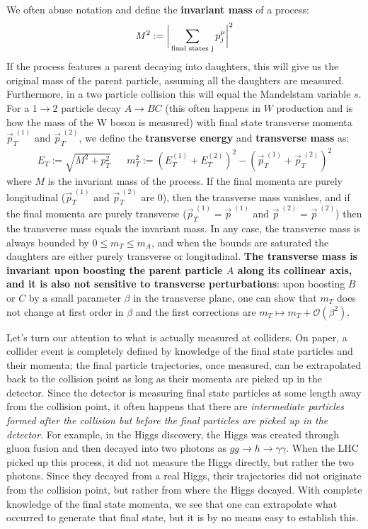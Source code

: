 \documentclass[11pt, oneside]{article}   	%
\theoremstyle{definition}
\numberwithin{equation}{subsection}		%
\begin{document}
We often abuse notation and define the \textbf{invariant mass} of a process:
\begin{equation}
	M^2 := \bigg|\sum_\textnormal{final states j} p_j^\mu\bigg|^2
\end{equation}
If the process features a parent decaying into daughters, this will give us the original mass of the parent particle, assuming all the daughters 
are measured. Furthermore, in a two particle collision this will equal the Mandelstam variable $s$. 
For a $1\rightarrow 2$ particle decay $A\rightarrow BC$ (this often happens in $W$ production and is how the mass of the W boson is 
measured) with final state transverse momenta $\vec p_T^{\;(1)}$ and $\vec p_T^{\;(2)}$, we define the \textbf{transverse energy} and 
\textbf{transverse mass} as:
\begin{align}
	E_T := \sqrt{M^2 + p_T^2} && m_T^2 := \left(E_T^{(1)} + E_T^{(2)}\right)^2 - \left(\vec p_T^{\;(1)} + \vec p_T^{\;(2)}\right)^2
\end{align}
where $M$ is the invariant mass of the process. If the final momenta are purely longitudinal ($\vec p_T^{\;(1)}$ and $\vec p_T^{\;(2)}$ are 0), 
then the transverse mass vanishes, and if the final momenta are purely transverse ($\vec p_T^{\;(1)} = \vec p^{\;(1)}$ and 
$\vec p^{\;(2)} = \vec p^{\;(2)}$) then the transverse mass equals the invariant mass. In any case, the transverse mass is always bounded by 
$0\leq m_T \leq m_A$, and when the bounds are saturated the daughters are either purely transverse or longitudinal. \textbf{The transverse 
mass is invariant upon boosting the parent particle $A$ along its collinear axis, and it is also not sensitive to transverse perturbations}: upon 
boosting $B$ or $C$ by a small parameter $\beta$ in the transverse plane, one can show that $m_T$ does not change at first order in 
$\beta$ and the first corrections are $m_T\mapsto m_T + \mathcal O(\beta^2)$. 

Let's turn our attention to what is actually measured at colliders. On paper, a collider event is completely defined by knowledge of the final 
state particles and their momenta; the final particle trajectories, once measured, can be extrapolated back to the collision point as long as 
their momenta are picked up in the detector. Since the detector is measuring final state particles at some length away from the collision point, 
it often happens that there are \textit{intermediate particles formed after the collision but before the final particles are picked up in the 
detector}. For example, in the Higgs discovery, the Higgs was created through gluon fusion and then decayed into two photons as 
$gg\rightarrow h\rightarrow\gamma\gamma$. When the LHC picked up this process, it did not measure the Higgs directly, but rather the two 
photons. Since they decayed from a real Higgs, their trajectories did not originate from the collision point, but rather from where the Higgs 
decayed. With complete knowledge of the final state momenta, we see that one can extrapolate what occurred to generate that final state, but 
it is by no means easy to establish this. 
\end{document}
